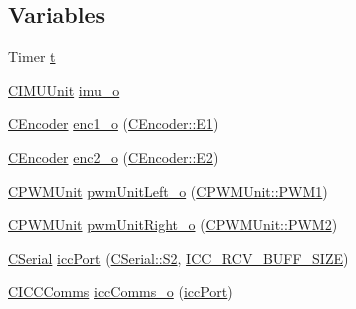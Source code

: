 \subsection*{Variables}
\begin{DoxyCompactItemize}
\item 
Timer \mbox{\hyperlink{_a_d_a_s___m_c_u_8ino_a978d88b393c8a37dc2614c88788b3442}{t}}
\item 
\mbox{\hyperlink{class_c_i_m_u_unit}{C\+I\+M\+U\+Unit}} \mbox{\hyperlink{_a_d_a_s___m_c_u_8ino_ae51e36f83228f859afeb8a72e60339a6}{imu\+\_\+o}}
\item 
\mbox{\hyperlink{class_c_encoder}{C\+Encoder}} \mbox{\hyperlink{_a_d_a_s___m_c_u_8ino_ad90699f8fbb0fa8f734ae5c30885ee3b}{enc1\+\_\+o}} (\mbox{\hyperlink{class_c_encoder_a49810cc352199fb02a60e2ef8ac6cbc3a8f0ceb6874e0c79b53bf26fa42a1b652}{C\+Encoder\+::\+E1}})
\item 
\mbox{\hyperlink{class_c_encoder}{C\+Encoder}} \mbox{\hyperlink{_a_d_a_s___m_c_u_8ino_a54cfc96aae4913b87ab356a0665557a5}{enc2\+\_\+o}} (\mbox{\hyperlink{class_c_encoder_a49810cc352199fb02a60e2ef8ac6cbc3aaa314a69656e242defabd33eb8e90284}{C\+Encoder\+::\+E2}})
\item 
\mbox{\hyperlink{class_c_p_w_m_unit}{C\+P\+W\+M\+Unit}} \mbox{\hyperlink{_a_d_a_s___m_c_u_8ino_a10a570a59ef56c08699c4fec61d47d16}{pwm\+Unit\+Left\+\_\+o}} (\mbox{\hyperlink{class_c_p_w_m_unit_ad3e55d1df0367d8a090d4b835704be44a3f6167a7882e80f1ad05c8bff5e538c0}{C\+P\+W\+M\+Unit\+::\+P\+W\+M1}})
\item 
\mbox{\hyperlink{class_c_p_w_m_unit}{C\+P\+W\+M\+Unit}} \mbox{\hyperlink{_a_d_a_s___m_c_u_8ino_a49af1ef8724d9cb785e37641bb0cdc6b}{pwm\+Unit\+Right\+\_\+o}} (\mbox{\hyperlink{class_c_p_w_m_unit_ad3e55d1df0367d8a090d4b835704be44afc7888ea63be5da5551d10db3d676185}{C\+P\+W\+M\+Unit\+::\+P\+W\+M2}})
\item 
\mbox{\hyperlink{class_c_serial}{C\+Serial}} \mbox{\hyperlink{_a_d_a_s___m_c_u_8ino_ad1e6d9fed4369104e412a46c019634d2}{icc\+Port}} (\mbox{\hyperlink{class_c_serial_a000039540cc90b18bafacf5744e7eda2a8cc95f4591147b0df028e003f82220a1}{C\+Serial\+::\+S2}}, \mbox{\hyperlink{_a_d_a_s___cfg_8h_abf41bed56ee0b2a8858687c4420bb110}{I\+C\+C\+\_\+\+R\+C\+V\+\_\+\+B\+U\+F\+F\+\_\+\+S\+I\+ZE}})
\item 
\mbox{\hyperlink{class_c_i_c_c_comms}{C\+I\+C\+C\+Comms}} \mbox{\hyperlink{_a_d_a_s___m_c_u_8ino_a62ef6b3308259edb69af585549178324}{icc\+Comms\+\_\+o}} (\mbox{\hyperlink{_a_d_a_s___m_c_u_8ino_ad1e6d9fed4369104e412a46c019634d2}{icc\+Port}})
\item 

\end{DoxyCompactItemize}
